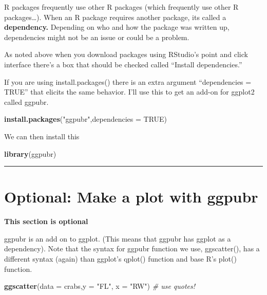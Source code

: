 \documentclass[]{book}
\newenvironment{Shaded}{\begin{snugshade}}{\end{snugshade}}
\newcommand{\KeywordTok}[1]{\textcolor[rgb]{0.13,0.29,0.53}{\textbf{#1}}}
\newcommand{\DataTypeTok}[1]{\textcolor[rgb]{0.13,0.29,0.53}{#1}}
\newcommand{\StringTok}[1]{\textcolor[rgb]{0.31,0.60,0.02}{#1}}
\newcommand{\CommentTok}[1]{\textcolor[rgb]{0.56,0.35,0.01}{\textit{#1}}}
\newcommand{\OtherTok}[1]{\textcolor[rgb]{0.56,0.35,0.01}{#1}}
\newcommand{\NormalTok}[1]{#1}
\theoremstyle{definition}
\theoremstyle{definition}
\theoremstyle{definition}
\theoremstyle{remark}
\begin{document}
R packages frequently use other R packages (which frequently use other R
packages\ldots{}). When an R package requires another package, its
called a \textbf{dependency.} Depending on who and how the package was
written up, dependencies might not be an issue or could be a problem.

As noted above when you download packages using RStudio's point and
click interface there's a box that should be checked called ``Install
dependencies.''

If you are using install.packages() there is an extra argument
``dependencies = TRUE'' that elicits the same behavior. I'll use this to
get an add-on for ggplot2 called ggpubr.

\begin{Shaded}
\begin{Highlighting}[]
\KeywordTok{install.packages}\NormalTok{(}\StringTok{"ggpubr"}\NormalTok{,}\DataTypeTok{dependencies =} \OtherTok{TRUE}\NormalTok{)}
\end{Highlighting}
\end{Shaded}

We can then install this

\begin{Shaded}
\begin{Highlighting}[]
\KeywordTok{library}\NormalTok{(ggpubr)}
\end{Highlighting}
\end{Shaded}

\begin{center}\rule{0.5\linewidth}{\linethickness}\end{center}

\section{Optional: Make a plot with
ggpubr}\label{optional-make-a-plot-with-ggpubr}

\textbf{This section is optional}

ggpubr is an add on to ggplot. (This means that ggpubr has ggplot as a
dependency). Note that the syntax for ggpubr function we use,
ggscatter(), has a different syntax (again) than ggplot's qplot()
function and base R's plot() function.

\begin{Shaded}
\begin{Highlighting}[]
\KeywordTok{ggscatter}\NormalTok{(}\DataTypeTok{data =}\NormalTok{ crabs,}\DataTypeTok{y =} \StringTok{"FL"}\NormalTok{, }\DataTypeTok{x =} \StringTok{"RW"}\NormalTok{) }\CommentTok{# use quotes!}
\end{Highlighting}
\end{Shaded}
\end{document}
